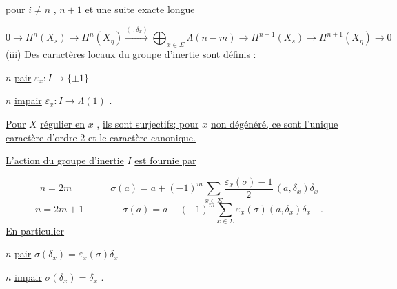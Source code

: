 \underline{pour} $i \neq n$ , $n+1$ \underline{et une suite exacte longue} 



\begin{equation*}
 0 \longrightarrow H^n(X_s) \longrightarrow H^n(X_{\overline{\eta}}) \overset{(\ , \delta_x)}{\longrightarrow} \bigoplus_{x \in \Sigma} \Lambda(n-m) \longrightarrow H^{n+1}(X_s) \longrightarrow H^{n+1}(X_{\overline{\eta}}) \longrightarrow 0
\end{equation*}
(iii) \underline{Des caractères locaux du groupe d'inertie sont définis} :

$n$ \quad \underline{pair} \qquad $\varepsilon_x : I \longrightarrow \{\pm 1\}$

$n$ \quad \underline{impair} \qquad $\varepsilon_x : I \longrightarrow \Lambda(1)$ .

\underline{Pour} $X$ \underline{régulier en} $x$ , \underline{ils sont surjectifs; pour} $x$ \underline{non dégénéré, ce sont l'unique caractère d'ordre 2 et le caractère canonique.}

\underline{L'action du groupe d'inertie} $I$ \underline{est fournie par}

\begin{equation*}
n = 2m \qquad\qquad \sigma(a) = a + (-1)^m \sum_{x \in \Sigma} \frac{\varepsilon_x(\sigma)-1}{2}\, (a,\delta_x)\delta_x
\end{equation*}
\begin{equation*}
n = 2m + 1 \qquad\qquad \sigma(a) = a - (-1)^m \sum_{x \in \Sigma} \varepsilon_x(\sigma)(a,\delta_x)\delta_x \quad .
\end{equation*}
\underline{En particulier}

$n$ \quad \underline{pair} \qquad $\sigma(\delta_x) = \varepsilon_x(\sigma)\delta_x$

$n$ \quad \underline{impair} \qquad $\sigma(\delta_x) = \delta_x$ .

